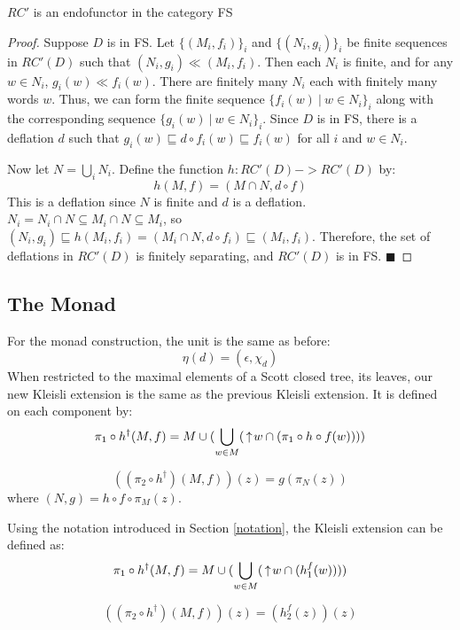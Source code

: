 \begin{theorem}
$RC'$ is an endofunctor in the category \textsf{FS}
\end{theorem}
\begin{proof}
Suppose $D$ is in \textsf{FS}.  Let $\{(M_i, f_i)\}_i$ and $\{(N_i, g_i)\}_i$ be finite sequences in $RC'(D)$ such that $(N_i, g_i) \ll (M_i,f_i)$.  Then each $N_i$ is finite, and for any $w\in N_i$, $g_i(w) \ll f_i(w)$.  There are finitely many $N_i$ each with finitely many words $w$.  Thus, we can form the finite sequence $\{f_i(w)\ |\ w\in N_i\}_i$ along with the corresponding sequence $\{g_i(w)\ |\ w\in N_i\}_i$.  Since $D$ is in \textsf{FS}, there is a deflation $d$ such that $g_i(w)\sqsubseteq d\circ f_i(w) \sqsubseteq f_i(w)$ for all $i$ and $w\in N_i$.

Now let $N = \bigcup_i N_i$.  Define the function $h:RC'(D)->RC'(D)$ by:
\[h(M,f) = (M\cap N, d\circ f)\]
This is a deflation since $N$ is finite and $d$ is a deflation.  $N_i=N_i\cap N \subseteq M_i\cap N \subseteq M_i$, so $(N_i,g_i)\sqsubseteq h(M_i,f_i) = (M_i\cap N, d\circ f_i) \sqsubseteq (M_i,f_i)$.  Therefore, the set of deflations in $RC'(D)$ is finitely separating, and $RC'(D)$ is in \textsf{FS}.
\hfill $\blacksquare$
\end{proof}

\subsection{The Monad}

For the monad construction, the unit is the same as before:  \[\eta(d) = (\epsilon, \chi_d)\]  When restricted to the maximal elements of a Scott closed tree, its leaves, our new Kleisli extension is the same as the previous Kleisli extension.	It is defined on each component by:
\[\pi_1\circ h^\dagger(M,f) = M \cup (\bigcup_{w\in M} (\,\uparrow\! w \cap (\pi_1 \circ h\circ f(w))))\]

\[((\pi_2\circ h^\dagger)(M,f))(z) = g(\pi_N(z))\]
where $(N, g) = h\circ f\circ \pi_M(z)$.

Using the notation introduced in Section \ref{notation}, the Kleisli extension can be defined as:
\[\pi_1\circ h^\dagger(M,f) = M \cup (\bigcup_{w\in M} (\,\uparrow\! w \cap (h_1^f(w))))\]

\[((\pi_2\circ h^\dagger)(M,f))(z) = (h_2^f(z))(z)\]

